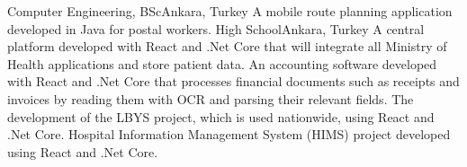 \documentclass[
    10pt,
    A4,
    english,
    draft = false,
    twoside = false,
]{article}
\begin{document}

	{Computer Engineering, BSc}{Ankara, Turkey}
    {
      {A mobile route planning application developed in Java for postal workers.}
    }
	{High School}{Ankara, Turkey}{}
    {
      {A central platform developed with React and .Net Core that will integrate all Ministry of Health applications and store patient data.}
      {An accounting software developed with React and .Net Core that processes financial documents such as receipts and invoices by reading them with OCR and parsing their relevant fields.}
    }
    {
      {The development of the LBYS project, which is used nationwide, using React and .Net Core.}
      {Hospital Information Management System (HIMS) project developed using React and .Net Core.}
    }
\end{document}
